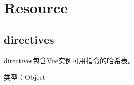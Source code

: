 \begin{lstlisting}[language=JavaScript]

\end{lstlisting}




\begin{lstlisting}[language=JavaScript]

\end{lstlisting}




\begin{lstlisting}[language=JavaScript]

\end{lstlisting}




\begin{lstlisting}[language=JavaScript]

\end{lstlisting}




\begin{lstlisting}[language=JavaScript]

\end{lstlisting}




\begin{lstlisting}[language=JavaScript]

\end{lstlisting}






\chapter{Resource}



\section{directives}

directives包含Vue实例可用指令的哈希表。

\begin{compactitem}
\item 类型：Object
\end{compactitem}





\begin{lstlisting}[language=JavaScript]

\end{lstlisting}




